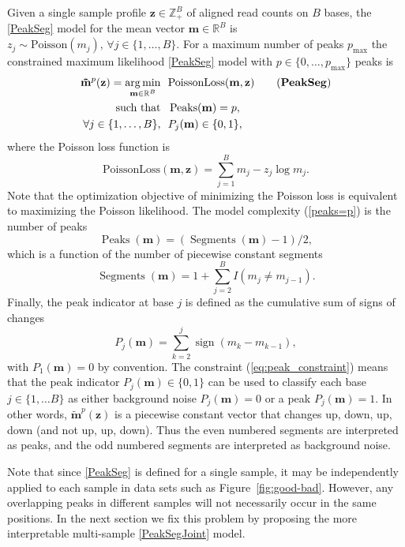 \documentclass{article} %
\DeclareMathOperator*{\argmin}{arg\,min}
\DeclareMathOperator*{\Peaks}{Peaks}
\DeclareMathOperator*{\Segments}{Segments}
\newcommand{\sign}{\operatorname{sign}}
\newcommand{\RR}{\mathbb R}
\newcommand{\ZZ}{\mathbb Z}
\begin{document}
Given a single sample profile $\mathbf z\in\ZZ_+^B$ of aligned read
counts on $B$ bases, the \ref{PeakSeg} model for the mean vector
$\mathbf m\in\RR^B$ is $z_j\sim \text{Poisson}(m_j), \, \forall j\in\{1,
\dots, B\}$. For a maximum number of peaks $p_{\text{max}}$ the
constrained maximum likelihood \ref{PeakSeg} model with $p\in\{0,
\dots, p_{\text{max}}\}$ peaks is 
\begin{align}
  \label{PeakSeg}
  \mathbf{\tilde m}^p(\mathbf z)  =
    \argmin_{\mathbf m\in\RR^{B}} &\ \ 
    \text{PoissonLoss}(\mathbf m, \mathbf z) 
    \tag{\textbf{PeakSeg}}
\\
    \text{such that} &\ \  \Peaks(\mathbf m)=p, \label{peaks=p} \\
     \forall j\in\{1, \dots, B\}, &\ \ P_j(\mathbf m) \in\{0, 1\},
    \label{eq:peak_constraint}
\end{align}
where the Poisson loss function is
\begin{equation}\label{eq:rho}
  \text{PoissonLoss}(\mathbf m, \mathbf z)= \sum_{j=1}^B m_j - z_j \log m_j.
\end{equation} 
Note that the optimization objective of minimizing the Poisson loss is
equivalent to maximizing the Poisson likelihood. The model complexity
(\ref{peaks=p}) is the number of peaks
\begin{equation}
  \Peaks(\mathbf m)=(\Segments(\mathbf m)-1)/2,
\end{equation}
which is a function of the number of piecewise constant segments
\begin{equation}
  \Segments(\mathbf m)=1+\sum_{j=2}^B I(m_j \neq m_{j-1}).
\end{equation}
Finally, the peak indicator at base $j$ is defined as the cumulative sum of
signs of changes
\begin{equation}
  \label{eq:peaks}
  P_j(\mathbf m) = \sum_{k=2}^j \sign( m_{k} - m_{k-1} ),
\end{equation}
with $P_1(\mathbf m)=0$ by convention. The constraint
(\ref{eq:peak_constraint}) means that the peak indicator $P_j(\mathbf
m)\in\{0, 1\}$ can be used to classify each base $j\in\{1,\dots B\}$
as either background noise $P_j(\mathbf m)=0$ or a peak $P_j(\mathbf
m)=1$.  In other words, $\mathbf{\tilde m}^p(\mathbf z)$ is a
piecewise constant vector that changes up, down, up, down (and not up,
up, down). Thus the even numbered segments are interpreted as peaks,
and the odd numbered segments are interpreted as background noise.

Note that since \ref{PeakSeg} is defined for a single sample, it may
be independently applied to each sample in data sets such as
Figure~\ref{fig:good-bad}. However, any overlapping peaks in different
samples will not necessarily occur in the same positions. In the next
section we fix this problem by proposing the more interpretable
multi-sample \ref{PeakSegJoint} model.
\end{document}
